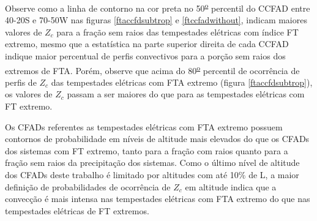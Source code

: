 Observe como a linha de contorno na cor preta no 50\textsuperscript{\underline{o}} percentil do CCFAD entre 40-20S e 70-50W nas figuras \ref{ftaccfdsubtrop} e \ref{ftccfadwithout}, indicam maiores valores de $Z_c$ para a fração sem raios das tempestades elétricas com índice FT extremo, mesmo que a estatística na parte superior direita de cada CCFAD indique maior percentual de perfis convectivos para a porção sem raios dos extremos de FTA. Porém, observe que acima do 80\textsuperscript{\underline{o}} percentil de ocorrência de perfis de $Z_c$ das tempestades elétricas com FTA extremo (figura \ref{ftaccfdsubtrop}), os valores de $Z_c$ passam a ser maiores do que para as tempestades elétricas com FT extremo. 



Os CFADs referentes as tempestades elétricas com FTA extremo possuem contornos de probabilidade em níveis de altitude mais elevados do que os CFADs dos sistemas com FT extremo, tanto para a fração com raios quanto para a fração sem raios da precipitação dos sistemas. Como o último nível de altitude dos CFADs deste trabalho é limitado por altitudes com até 10\% de L, a maior definição de probabilidades de ocorrência de $Z_c$ em altitude indica que a convecção é mais intensa nas tempestades elétricas com FTA extremo do que nas tempestades elétricas de FT extremos.






